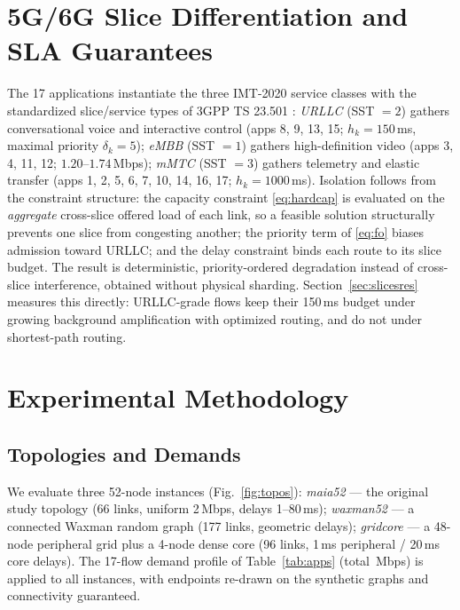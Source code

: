 \documentclass[journal]{IEEEtran}
\begin{document}
\section{5G/6G Slice Differentiation and SLA Guarantees}
\label{sec:slices}
The 17 applications instantiate the three IMT-2020 service classes
\cite{itu-m2083} with the standardized slice/service types of 3GPP TS
23.501 \cite{3gpp-ts23501}: \emph{URLLC} (SST $=2$) gathers conversational
voice and interactive control (apps 8, 9, 13, 15; $h_k=150$\,ms, maximal
priority $\delta_k=5$); \emph{eMBB} (SST $=1$) gathers high-definition video
(apps 3, 4, 11, 12; $1.20$--$1.74$\,Mbps); \emph{mMTC} (SST $=3$) gathers
telemetry and elastic transfer (apps 1, 2, 5, 6, 7, 10, 14, 16, 17;
$h_k=1000$\,ms). Isolation follows from the constraint structure: the
capacity constraint \eqref{eq:hardcap} is evaluated on the \emph{aggregate}
cross-slice offered load of each link, so a feasible solution structurally
prevents one slice from congesting another; the priority term of
\eqref{eq:fo} biases admission toward URLLC; and the delay constraint binds
each route to its slice budget. The result is deterministic, priority-ordered
degradation instead of cross-slice interference, obtained without physical
sharding. Section~\ref{sec:slicesres} measures this directly: URLLC-grade
flows keep their 150\,ms budget under growing background amplification with
optimized routing, and do not under shortest-path routing.

\section{Experimental Methodology}
\label{sec:setup}
\subsection{Topologies and Demands}
We evaluate three 52-node instances (Fig.~\ref{fig:topos}):
\emph{maia52} --- the original study topology (66 links, uniform 2\,Mbps,
delays 1--80\,ms); \emph{waxman52} --- a connected Waxman random graph
\cite{waxman1988} (177 links, geometric delays); \emph{gridcore} --- a
48-node peripheral grid plus a 4-node dense core (96 links, 1\,ms
peripheral / 20\,ms core delays). The 17-flow demand profile of
Table~\ref{tab:apps} (total \TotalDemand\,Mbps) is applied to all
instances, with endpoints re-drawn on the synthetic graphs and connectivity
guaranteed.
\end{document}
